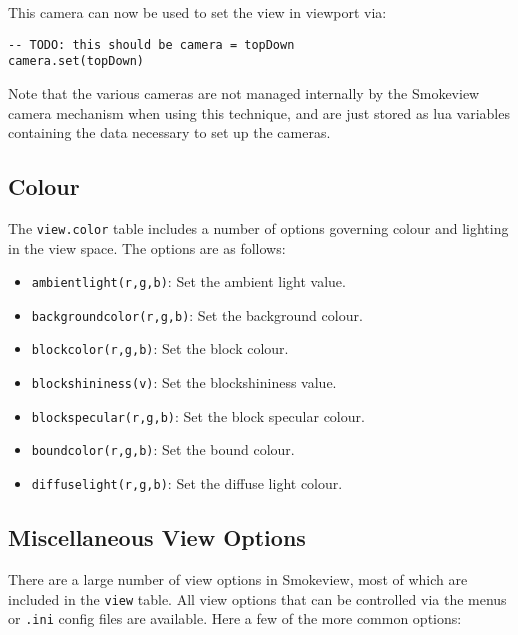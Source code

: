 \documentclass[11pt,twoside]{book}
\begin{document}
This camera can now be used to set the view in viewport via:

\begin{lstlisting}[style=lua]
-- TODO: this should be camera = topDown
camera.set(topDown)
\end{lstlisting}

Note that the various cameras are not managed internally by the Smokeview camera
mechanism when using this technique, and are just stored as lua variables
containing the data necessary to set up the cameras.

\subsection{Colour}

The \lstinline{view.color} table includes a number of options governing colour
and lighting in the view space. The options are as follows:

\begin{itemize}
\item \lstinline{ambientlight(r,g,b)}: Set the ambient light value.

\item \lstinline{backgroundcolor(r,g,b)}: Set the background colour.

\item \lstinline{blockcolor(r,g,b)}: Set the block colour.

\item \lstinline{blockshininess(v)}: Set the blockshininess value.

\item \lstinline{blockspecular(r,g,b)}: Set the block specular colour.

\item \lstinline{boundcolor(r,g,b)}: Set the bound colour.

\item \lstinline{diffuselight(r,g,b)}: Set the diffuse light colour.
\end{itemize}
\subsection{Miscellaneous View Options}

There are a large number of view options in Smokeview, most of which are
included in the \lstinline{view} table. All view options that can be controlled
via the menus or \verb|.ini| config files are available. Here a few of the more
common options:
\end{document}
